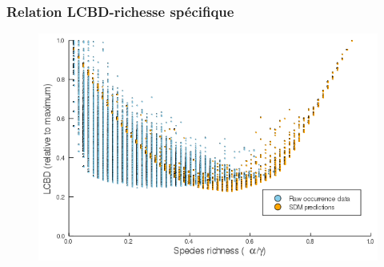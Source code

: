 \documentclass[10pt]{beamer}
\begin{document}
\begin{frame}
  \frametitle{Relation LCBD-richesse spécifique}
  \begin{figure}
    \centering
    \includegraphics[scale=0.4]{fig/06_cmb_relation-oneplot.png}
  \end{figure}
\end{frame}
\end{document}
